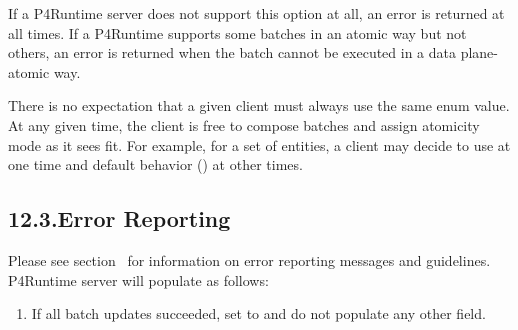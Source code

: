\documentclass[11pt]{article}
\begin{document}
{\begin{itemize}
If a P4Runtime server does not support this option at all, an 
error is returned at all times. If a P4Runtime supports some batches in an
atomic way but not others, an  error is returned when the batch
cannot be executed in a data plane-atomic way.%
\end{itemize}%

\noindent{}There is no expectation that a given client must always use the same 
enum value. At any given time, the client is free to compose batches and assign
atomicity mode as it sees fit. For example, for a set of entities, a client may
decide to use  at one time and default behavior
() at other times.%

\subsection{12.3.\hspace*{0.5em}Error Reporting}\label{sec-error-reporting}%

\noindent{}Please see section~ for
information on error reporting messages and guidelines. P4Runtime server will
populate  as follows:%

\begin{enumerate}%

\item{}
If all batch updates succeeded, set  to  and do not
populate any other field.%


\end{enumerate}}
\end{document}
